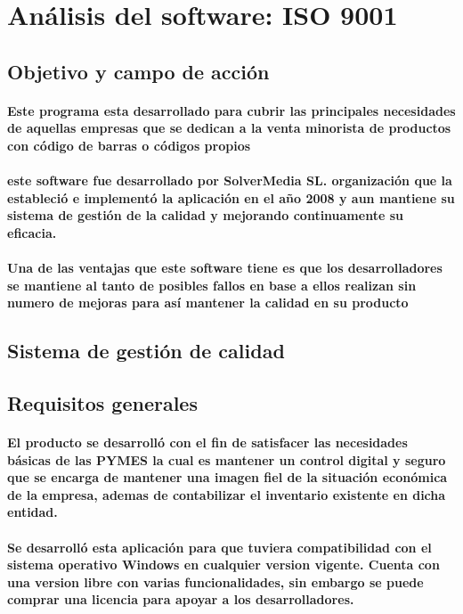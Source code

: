 \documentclass[12pt,a4paper]{ articule }
\begin{document}
\section{Análisis del software: ISO 9001}
\subsection{Objetivo y campo de acción}
\paragraph{Este programa esta desarrollado para cubrir las principales necesidades de aquellas empresas que se dedican a la venta minorista de productos con código de barras o códigos propios}
\paragraph{este software fue desarrollado por SolverMedia SL. organización que la estableció e implementó la aplicación en el año 2008 y aun mantiene su sistema de gestión de la calidad y mejorando continuamente su eficacia.}
\paragraph{Una de las ventajas que este software tiene es que los desarrolladores se mantiene al tanto de posibles fallos en base a ellos realizan sin numero de mejoras para así mantener la calidad en su producto}

\subsection{Sistema de gestión de calidad}
\subsection*{Requisitos generales}
\paragraph{El producto se desarrolló con el fin de satisfacer las necesidades básicas de las PYMES la cual es mantener un control digital y seguro que se encarga de mantener una imagen fiel de la situación económica de la empresa, ademas de contabilizar el inventario existente en dicha entidad.}
\paragraph{Se desarrolló esta aplicación para que tuviera compatibilidad con el sistema operativo Windows en cualquier version vigente. Cuenta con una version libre con varias funcionalidades, sin embargo se puede comprar una licencia para apoyar a los desarrolladores.}
\end{document}
